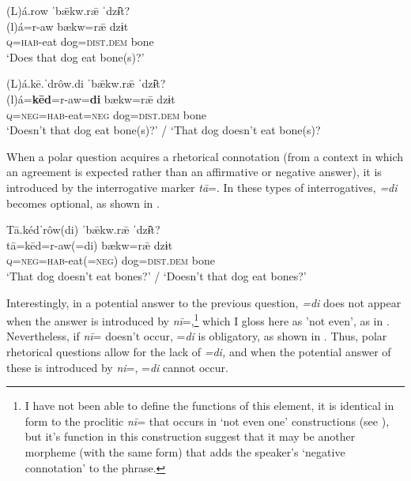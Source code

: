 \documentclass[output=paper,colorlinks=true, citecolor=brown]{langscibook}
\begin{document}
\ea\label{ex:zap:28} 
    \glll (L)á.row ˈbǣkw.rǣ ˈdzɨ̂t?\\ 
          (l)á=r-aw bækw=rǣ dzɨt\\
          \textsc{q}=\textsc{hab}{}-eat dog=\textsc{dist.dem} bone\\
    \glt ‘Does that dog eat bone(s)?’ 
\z 

\ea\label{ex:zap:29} 
    \glll (L)á.kē.ˈdrôw.di ˈbǣkw.rǣ ˈdzɨ̂t?\\ 
          (l)á=\textbf{kēd}=r-aw=\textbf{di} bækw=rǣ dzɨt\\
          \textsc{q}=\textsc{neg}=\textsc{hab}{}-eat=\textsc{neg} dog=\textsc{dist.dem} bone\\
    \glt ‘Doesn’t that dog eat bone(s)?’ / ‘That dog doesn’t eat bone(s)?
\z 

\z 

When a polar question acquires a rhetorical connotation (from a context in which an agreement is expected rather than an affirmative or negative answer), it is introduced by the interrogative marker \textit{tā}=. In these types of interrogatives, \textit{=di} becomes optional, as shown in . 

\ea\label{ex:zap:31} 
    \glll Tā.kédˈrôw(di) ˈbǣkw.rǣ ˈdzɨ̂t?\\ 
          tā=kēd=r-aw(=di) bækw=rǣ dzɨt\\
          \textsc{q}=\textsc{neg}=\textsc{hab}{}-eat(=\textsc{neg}) dog=\textsc{dist.dem} bone\\
    \glt ‘That dog doesn’t eat bones?’ / ‘Doesn’t that dog eat bones?’
\z 

Interestingly, in a potential answer to the previous question, \textit{=di} does not appear when the answer is introduced by \textit{nī}=,\footnote{I have not been able to define the functions of this element, it is identical in form to the proclitic \textit{nī}= that occurs in ‘not even one’ constructions (see ), but it’s function in this construction suggest that it may be another morpheme (with the same form) that adds the speaker’s ‘negative connotation’ to the phrase.} which I gloss here as 'not even', as in . Nevertheless, if \textit{nī}= doesn’t occur, =\textit{di} is obligatory, as shown in . Thus, polar rhetorical questions allow for the lack of \textit{=di,} and when the potential answer of these is introduced by \textit{ni}=, =\textit{di} cannot occur. 
\end{document}

